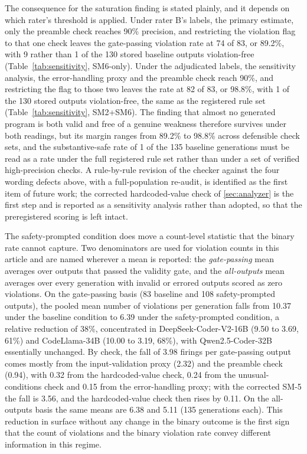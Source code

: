 \documentclass{ieeeaccess}
\begin{document}
The consequence for the saturation finding is stated plainly, and it depends on which
rater's threshold is applied. Under rater B's labels, the primary estimate, only the
preamble check reaches 90\% precision, and restricting the violation flag to that one check
leaves the gate-passing violation rate at 74 of 83, or 89.2\%, with 9 rather than 1 of the
130 stored baseline outputs violation-free (Table~\ref{tab:sensitivity}, SM6-only). Under
the adjudicated labels, the sensitivity analysis, the error-handling proxy and the preamble
check reach 90\%, and restricting the flag to those two leaves the rate at 82 of 83, or
98.8\%, with 1 of the 130 stored outputs violation-free, the same as the registered
rule set (Table~\ref{tab:sensitivity}, SM2+SM6). The finding that almost no generated
program is both valid and free of a genuine weakness therefore survives under both
readings, but its margin ranges from 89.2\% to 98.8\% across defensible check sets, and
the substantive-safe rate of 1 of the 135 baseline generations must be read as a rate under the full registered
rule set rather than under a set of verified high-precision checks. A rule-by-rule
revision of the checker against the four wording defects above, with a full-population
re-audit, is identified as the first item of future work; the corrected hardcoded-value
check of \ref{sec:analyzer} is the first step and is reported as a sensitivity analysis
rather than adopted, so that the preregistered scoring is left intact.



The safety-prompted condition does move a count-level statistic that the binary rate
cannot capture. Two denominators are used for violation counts in this article and are
named wherever a mean is reported: the \emph{gate-passing} mean averages over outputs that
passed the validity gate, and the \emph{all-outputs} mean averages over every generation
with invalid or errored outputs scored as zero violations. On the gate-passing basis (83
baseline and 108 safety-prompted outputs), the pooled mean number of violations per
generation falls from 10.37 under the baseline condition to 6.39 under the safety-prompted
condition, a relative reduction of 38\%, concentrated in DeepSeek-Coder-V2-16B (9.50 to
3.69, 61\%) and CodeLlama-34B (10.00 to 3.19, 68\%), with Qwen2.5-Coder-32B essentially
unchanged. By check, the fall of 3.98 firings per gate-passing output comes mostly from
the input-validation proxy (2.32) and the preamble check (0.94), with 0.32 from the
hardcoded-value check, 0.24 from the unusual-conditions check and 0.15 from the
error-handling proxy; with the corrected SM-5 the fall is 3.56, and the hardcoded-value
check then rises by 0.11. On the all-outputs basis the same means are 6.38 and 5.11 (135 generations each). This
reduction in surface without any change in the binary outcome is the first sign that
the count of violations and the binary violation rate convey different information in
this regime.
\end{document}
